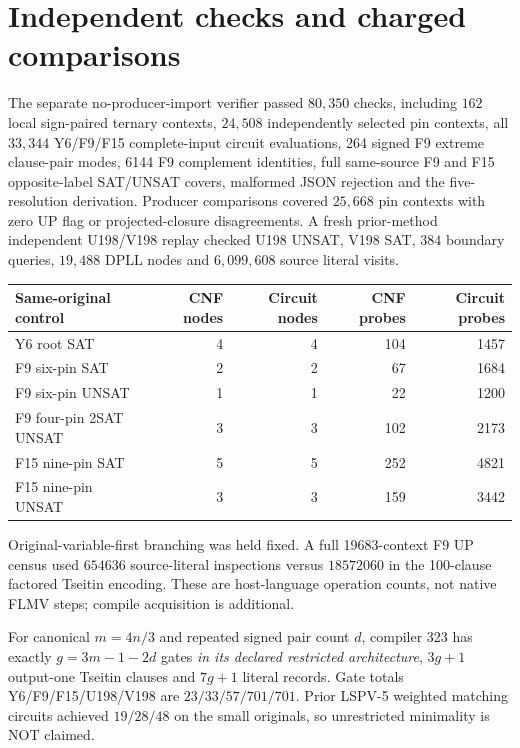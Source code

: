 \documentclass[11pt]{article}
\begin{document}
\section{Independent checks and charged comparisons}
The separate no-producer-import verifier passed $80{,}350$ checks, including $162$ local sign-paired ternary contexts, $24{,}508$ independently selected pin contexts, all $33{,}344$ Y6/F9/F15 complete-input circuit evaluations, 264 signed F9 extreme clause-pair modes, 6144 F9 complement identities, full same-source F9 and F15 opposite-label SAT/UNSAT covers, malformed JSON rejection and the five-resolution derivation. Producer comparisons covered $25{,}668$ pin contexts with zero UP flag or projected-closure disagreements. A fresh prior-method independent U198/V198 replay checked U198 UNSAT, V198 SAT, $384$ boundary queries, $19{,}488$ DPLL nodes and $6{,}099{,}608$ source literal visits.

\begin{center}\begin{tabular}{lrrrr}
\toprule
Same-original control& CNF nodes& Circuit nodes& CNF probes& Circuit probes\\\midrule
Y6 root SAT&4&4&104&1457\\
F9 six-pin SAT&2&2&67&1684\\
F9 six-pin UNSAT&1&1&22&1200\\
F9 four-pin 2SAT UNSAT&3&3&102&2173\\
F15 nine-pin SAT&5&5&252&4821\\
F15 nine-pin UNSAT&3&3&159&3442\\\bottomrule
\end{tabular}\end{center}
Original-variable-first branching was held fixed. A full 19683-context F9 UP census used $654636$ source-literal inspections versus $18572060$ in the 100-clause factored Tseitin encoding. These are host-language operation counts, not native FLMV steps; compile acquisition is additional.

For canonical $m=4n/3$ and repeated signed pair count $d$, compiler 323 has exactly $g=3m-1-2d$ gates \emph{in its declared restricted architecture}, $3g+1$ output-one Tseitin clauses and $7g+1$ literal records. Gate totals Y6/F9/F15/U198/V198 are $23/33/57/701/701$. Prior LSPV-5 weighted matching circuits achieved $19/28/48$ on the small originals, so unrestricted minimality is NOT claimed.
\end{document}
